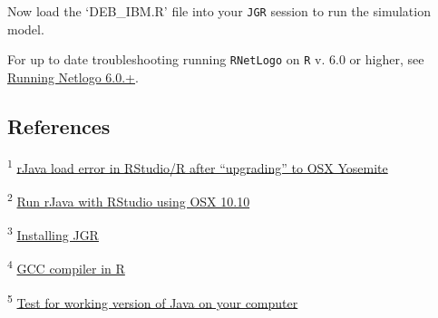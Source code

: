 \documentclass[10,portrait]{article}
\begin{document}
Now load the `DEB\_IBM.R' file into your \texttt{JGR} session to run the
simulation model.

For up to date troubleshooting running \texttt{RNetLogo} on \texttt{R}
v. 6.0 or higher, see
\href{https://github.com/NetLogo/NetLogo/issues/1282}{Running Netlogo
6.0.+}.

\hypertarget{references}{\subsection{References}\label{references}}

\textsuperscript{1}
\href{https://stackoverflow.com/questions/30738974/rjava-load-error-in-rstudio-r-after-upgrading-to-osx-yosemite}{rJava
load error in RStudio/R after ``upgrading'' to OSX Yosemite}

\textsuperscript{2}
\href{http://paulklemm.com/blog/2015-02-20-run-rjava-with-rstudio-under-osx-10-dot-10/}{Run
rJava with RStudio using OSX 10.10}

\textsuperscript{3} \href{https://github.com/markush81/JGR}{Installing
JGR}

\textsuperscript{4}
\href{https://stackoverflow.com/questions/1616983/building-r-packages-using-alternate-gcc}{GCC
compiler in R}

\textsuperscript{5}
\href{https://stackoverflow.com/questions/14915898/rnetlogo-function-nlstart-fails-to-launch-gui}{Test
for working version of Java on your computer}

\printbibliography
\end{document}
